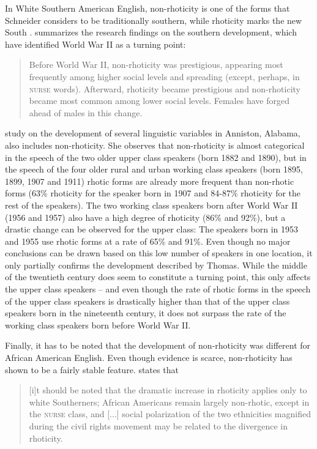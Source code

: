 In White Southern American English, non-rhoticity is one of the forms that Schneider considers to be traditionally southern, while rhoticity marks the new South \citep[299]{Schneider2007}. \citet[107]{Thomas2008} summarizes the research findings on the southern development, which have identified World War II as a turning point:

\begin{quote}
Before World War II, non-rhoticity was prestigious, appearing most frequently among higher social levels and spreading (except, perhaps, in \textsc{nurse} words). Afterward, rhoticity became prestigious and non-rhoticity became most common among lower social levels. Females have forged ahead of males in this change.
\end{quote}


 study on the development of several linguistic variables in Anniston, Alabama, also includes non-rhoticity. She observes that non-rhoticity is almost categorical in the speech of the two older upper class speakers (born 1882 and 1890), but in the speech of the four older rural and urban working class speakers (born 1895, 1899, 1907 and 1911) rhotic forms are already more frequent than non-rhotic forms (63\% rhoticity for the speaker born in 1907 and 84-87\% rhoticity for the rest of the speakers). The two working class speakers born after World War II (1956 and 1957) also have a high degree of rhoticity (86\% and 92\%), but a drastic change can be observed for the upper class: The speakers born in 1953 and 1955 use rhotic forms at a rate of 65\% and 91\%. Even though no major conclusions can be drawn based on this low number of speakers in one location, it only partially confirms the development described by Thomas. While the middle of the twentieth century does seem to constitute a turning point, this only affects the upper class speakers – and even though the rate of rhotic forms in the speech of the upper class speakers is drastically higher than that of the upper class speakers born in the nineteenth century, it does not surpass the rate of the working class speakers born before World War II.


Finally, it has to be noted that the development of non-rhoticity was different for African American English. Even though evidence is scarce, non-rhoticity has shown to be a fairly stable feature. \citet[107]{Thomas2008} states that

\begin{quote}
[i]t should be noted that the dramatic increase in rhoticity applies only to white Southerners; African Americans remain largely non-rhotic, except in the \textsc{nurse} class, and [...] social polarization of the two ethnicities magnified during the civil rights movement may be related to the divergence in rhoticity.
\end{quote}

